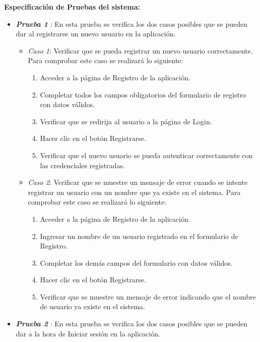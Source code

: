\textbf{Especificación de Pruebas del sistema:}

\begin{itemize}
    \item \textbf{\textit{Prueba 1}} \label{Prueba1}: En esta prueba se verifica los dos casos posibles que se pueden dar al registrarse un nuevo usuario en la aplicación.

    \begin{itemize}
        \item \textit{Caso 1}:
    Verificar que se pueda registrar un nuevo usuario correctamente. Para comprobar este caso se realizará lo siguiente:
   \begin{enumerate}
       \item Acceder a la página de Registro de la aplicación.
       \item  Completar todos los campos obligatorios del formulario de registro con datos válidos.
       \item Verificar que se redirija al usuario a la página de Login.
       \item Hacer clic en el botón Registrarse.
       \item Verificar que el nuevo usuario se pueda autenticar correctamente con las credenciales registradas.
   \end{enumerate}
    \end{itemize}

    \begin{itemize}
        \item \textit{Caso 2}:
    Verificar que se muestre un mensaje de error cuando se intente registrar un usuario con un nombre que ya existe en el sistema. Para comprobar este caso se realizará lo siguiente:
   \begin{enumerate}
       \item Acceder a la página de Registro de la aplicación.
       \item Ingresar un nombre de un usuario registrado en el formulario de Registro.
       \item  Completar los demás campos del formulario con datos válidos.
       \item Hacer clic en el botón Registrarse.
       \item Verificar que se muestre un mensaje de error indicando que el nombre de usuario ya existe en el sistema. 
   \end{enumerate}
    \end{itemize}
    
    \item \textbf{\textit{Prueba 2}} \label{Prueba2}: En esta prueba se verifica los dos casos posibles que se pueden dar a la hora de Iniciar sesión en la aplicación.


\end{itemize}
